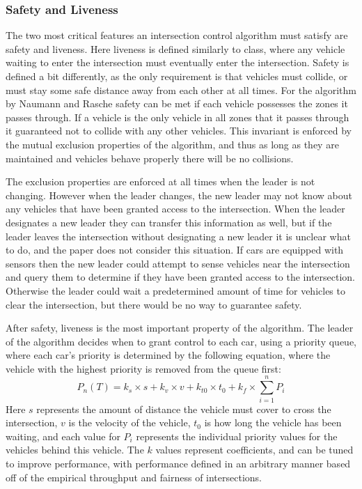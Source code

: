 \documentclass[12pt]{article}
\begin{document}
\subsubsection{Safety and Liveness}
The two most critical features an intersection control algorithm must satisfy are safety and liveness. Here liveness is defined similarly to class, where any vehicle waiting to enter the intersection must eventually enter the intersection. Safety is defined a bit differently, as the only requirement is that vehicles must collide, or must stay some safe distance away from each other at all times. For the algorithm by Naumann and Rasche safety can be met if each vehicle possesses the zones it passes through. If a vehicle is the only vehicle in all zones that it passes through it guaranteed not to collide with any other vehicles. This invariant is enforced by the mutual exclusion properties of the algorithm, and thus as long as they are maintained and vehicles behave properly there will be no collisions.\par
The exclusion properties are enforced at all times when the leader is not changing. However when the leader changes, the new leader may not know about any vehicles that have been granted access to the intersection. When the leader designates a new leader they can transfer this information as well, but if the leader leaves the intersection without designating a new leader it is unclear what to do, and the paper does not consider this situation. If cars are equipped with sensors then the new leader could attempt to sense vehicles near the intersection and query them to determine if they have been granted access to the intersection. Otherwise the leader could wait a predetermined amount of time for vehicles to clear the intersection, but there would be no way to guarantee safety.\par
After safety, liveness is the most important property of the algorithm. The leader of the algorithm decides when to grant control to each car, using a priority queue, where each car's priority is determined by the following equation, where the vehicle with the highest priority is removed from the queue first:
\begin{equation}
P_n(T) = k_s \times s + k_v \times v + k_{t0} \times t_0 + k_f \times \sum_{i=1}^{n} P_i 
\end{equation}
Here $s$ represents the amount of distance the vehicle must cover to cross the intersection, $v$ is the velocity of the vehicle, $t_0$ is how long the vehicle has been waiting, and each value for $P_i$ represents the individual priority values for the vehicles behind this vehicle. The $k$ values represent coefficients, and can be tuned to improve performance, with performance defined in an arbitrary manner based off of the empirical throughput and fairness of intersections.\par
\end{document}
